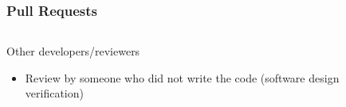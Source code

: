 \documentclass[12pt]{beamer}
\begin{document}
\begin{frame}
\frametitle{Pull Requests}

\begin{columns}
\begin{column}{0.5\textwidth}

Other developers/reviewers
    \begin{itemize}
    \item{Review by someone who did not write the code (\alert{software design verification})}
    \end{itemize}
\end{column}
\begin{column}{0.5\textwidth}

\end{column}
\end{columns}
\end{frame}
\end{document}
